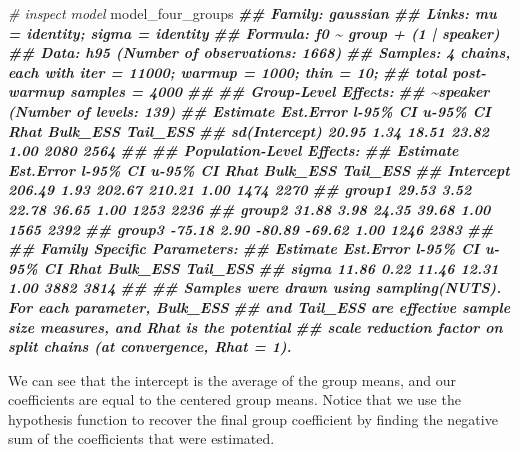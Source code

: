 \documentclass[
]{book}
\newenvironment{Shaded}{\begin{snugshade}}{\end{snugshade}}
\newcommand{\CommentTok}[1]{\textcolor[rgb]{0.56,0.35,0.01}{\textit{#1}}}
\newcommand{\DocumentationTok}[1]{\textcolor[rgb]{0.56,0.35,0.01}{\textbf{\textit{#1}}}}
\newcommand{\NormalTok}[1]{#1}
\begin{document}
\begin{Shaded}
\begin{Highlighting}[]
\CommentTok{\# inspect model}
\NormalTok{model\_four\_groups}
\DocumentationTok{\#\#  Family: gaussian }
\DocumentationTok{\#\#   Links: mu = identity; sigma = identity }
\DocumentationTok{\#\# Formula: f0 \textasciitilde{} group + (1 | speaker) }
\DocumentationTok{\#\#    Data: h95 (Number of observations: 1668) }
\DocumentationTok{\#\# Samples: 4 chains, each with iter = 11000; warmup = 1000; thin = 10;}
\DocumentationTok{\#\#          total post{-}warmup samples = 4000}
\DocumentationTok{\#\# }
\DocumentationTok{\#\# Group{-}Level Effects: }
\DocumentationTok{\#\# \textasciitilde{}speaker (Number of levels: 139) }
\DocumentationTok{\#\#               Estimate Est.Error l{-}95\% CI u{-}95\% CI Rhat Bulk\_ESS Tail\_ESS}
\DocumentationTok{\#\# sd(Intercept)    20.95      1.34    18.51    23.82 1.00     2080     2564}
\DocumentationTok{\#\# }
\DocumentationTok{\#\# Population{-}Level Effects: }
\DocumentationTok{\#\#           Estimate Est.Error l{-}95\% CI u{-}95\% CI Rhat Bulk\_ESS Tail\_ESS}
\DocumentationTok{\#\# Intercept   206.49      1.93   202.67   210.21 1.00     1474     2270}
\DocumentationTok{\#\# group1       29.53      3.52    22.78    36.65 1.00     1253     2236}
\DocumentationTok{\#\# group2       31.88      3.98    24.35    39.68 1.00     1565     2392}
\DocumentationTok{\#\# group3      {-}75.18      2.90   {-}80.89   {-}69.62 1.00     1246     2383}
\DocumentationTok{\#\# }
\DocumentationTok{\#\# Family Specific Parameters: }
\DocumentationTok{\#\#       Estimate Est.Error l{-}95\% CI u{-}95\% CI Rhat Bulk\_ESS Tail\_ESS}
\DocumentationTok{\#\# sigma    11.86      0.22    11.46    12.31 1.00     3882     3814}
\DocumentationTok{\#\# }
\DocumentationTok{\#\# Samples were drawn using sampling(NUTS). For each parameter, Bulk\_ESS}
\DocumentationTok{\#\# and Tail\_ESS are effective sample size measures, and Rhat is the potential}
\DocumentationTok{\#\# scale reduction factor on split chains (at convergence, Rhat = 1).}
\end{Highlighting}
\end{Shaded}

We can see that the intercept is the average of the group means, and our coefficients are equal to the centered group means. Notice that we use the hypothesis function to recover the final group coefficient by finding the negative sum of the coefficients that were estimated.
\end{document}
